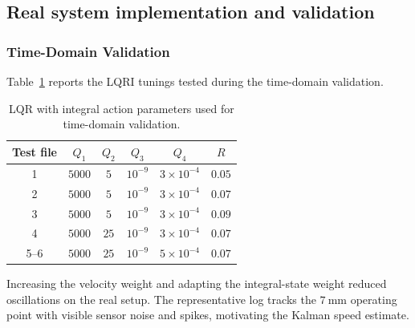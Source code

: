 \subsection{Real system implementation and validation}
\subsubsection{Time-Domain Validation}
Table~\ref{tab:lqri_time_parameters} reports the LQRI tunings tested during the time-domain validation.
\begin{table}[H]
\centering
\caption{LQR with integral action parameters used for time-domain validation.}
\label{tab:lqri_time_parameters}
\begin{tabular}{cccccc}
\toprule
Test file & $Q_1$ & $Q_2$ & $Q_3$ & $Q_4$ & $R$ \\
\midrule
1 & $5000$ & $5$  & $10^{-9}$ & $3\times10^{-4}$ & $0.05$ \\
2 & $5000$ & $5$  & $10^{-9}$ & $3\times10^{-4}$ & $0.07$ \\
3 & $5000$ & $5$  & $10^{-9}$ & $3\times10^{-4}$ & $0.09$ \\
4 & $5000$ & $25$ & $10^{-9}$ & $3\times10^{-4}$ & $0.07$ \\
5--6 & $5000$ & $25$ & $10^{-9}$ & $5\times10^{-4}$ & $0.07$ \\
\bottomrule
\end{tabular}
\end{table}

Increasing the velocity weight and adapting the integral-state weight reduced oscillations on the real setup.
The representative log tracks the $7~\mathrm{mm}$ operating point with visible sensor noise and spikes,
motivating the Kalman speed estimate.

